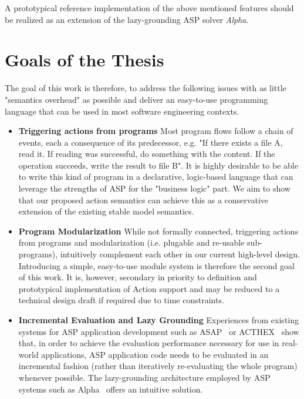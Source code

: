 \documentclass[12pt, letterpaper, twoside]{scrartcl}
\begin{document}
A prototypical reference implementation of the above mentioned features should be realized as an extension of the lazy-grounding ASP solver \emph{Alpha}.

\section{Goals of the Thesis}
\label{sec:goals}

The goal of this work is therefore, to address the following issues with as little "semantics overhead" as possible and deliver an easy-to-use programming language that can be used in most software engineering contexts.
\begin{itemize}
\item \textbf{Triggering actions from programs} Most program flows follow a chain of events, each a consequence of its predecessor, e.g. "If there exists a file A, read it. If reading was successful, do something with the content. If the operation succeeds, write the result to file B". It is highly desirable to be able to write this kind of program in a declarative, logic-based language that can leverage the strengths of ASP for the "business logic" part. We aim to show that our proposed action semantics can achieve this as a conservative extension of the existing stable model semantics.
\item \textbf{Program Modularization} While not formally connected, triggering actions from programs and modularization (i.e. plugable and re-usable sub-programs), intuitively complement each other in our current high-level design. Introducing a simple, easy-to-use module system is therefore the second goal of this work. It is, however, secondary in priority to definition and prototypical implementation of Action support and may be reduced to a technical design draft if required due to time constraints.
\item \textbf{Incremental Evaluation and Lazy Grounding} Experiences from existing systems for ASP application development such as ASAP~\cite{aspetris} or ACTHEX~\cite{acthex} show that, in order to achieve the evaluation performance necessary for use in real-world applications, ASP application code needs to be evaluated in an incremental fashion (rather than iteratively re-evaluating the whole program) whenever possible. The lazy-grounding architecture employed by ASP systems such as Alpha~\cite{alpha} offers an intuitive solution.
\end{itemize}
\end{document}
